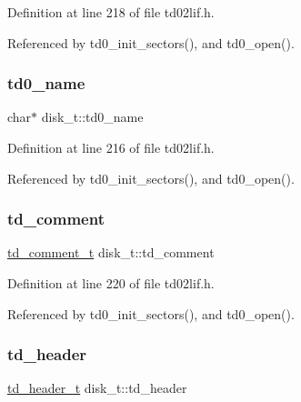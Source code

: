 Definition at line 218 of file td02lif.\+h.



Referenced by td0\+\_\+init\+\_\+sectors(), and td0\+\_\+open().

\mbox{\label{structdisk__t_a8be70c86aaffb22bab0e0969630a7062}} 
\subsubsection{\texorpdfstring{td0\+\_\+name}{td0\_name}}
{\footnotesize\ttfamily char$\ast$ disk\+\_\+t\+::td0\+\_\+name}



Definition at line 216 of file td02lif.\+h.



Referenced by td0\+\_\+init\+\_\+sectors(), and td0\+\_\+open().

\mbox{\label{structdisk__t_a7d84ffa6301a1e05b5a8a686d710bb8f}} 
\subsubsection{\texorpdfstring{td\+\_\+comment}{td\_comment}}
{\footnotesize\ttfamily \hyperlink{structtd__comment__t}{td\+\_\+comment\+\_\+t} disk\+\_\+t\+::td\+\_\+comment}



Definition at line 220 of file td02lif.\+h.



Referenced by td0\+\_\+init\+\_\+sectors(), and td0\+\_\+open().

\mbox{\label{structdisk__t_a83cf946593922db2bdedef21bb7b4aff}} 
\subsubsection{\texorpdfstring{td\+\_\+header}{td\_header}}
{\footnotesize\ttfamily \hyperlink{structtd__header__t}{td\+\_\+header\+\_\+t} disk\+\_\+t\+::td\+\_\+header}



